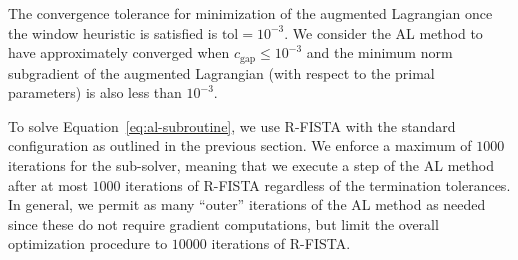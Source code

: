 The convergence tolerance for minimization of the augmented Lagrangian once the window heuristic is satisfied is \( \text{tol} = 10^{-3} \).
We consider the AL method to have approximately converged when \( c_{\text{gap}} \leq 10^{-3} \) and the minimum norm subgradient of the augmented Lagrangian (with respect to the primal parameters) is also less than \( 10^{-3} \).

To solve Equation~\eqref{eq:al-subroutine}, we use R-FISTA with the standard configuration as outlined in the previous section.
We enforce a maximum of \( 1000 \) iterations for the sub-solver, meaning that we execute a step of the AL method after at most \( 1000 \) iterations of R-FISTA regardless of the termination tolerances.
In general, we permit as many ``outer'' iterations of the AL method as needed since these do not require gradient computations, but limit the overall optimization procedure to \( 10000 \) iterations of R-FISTA.
